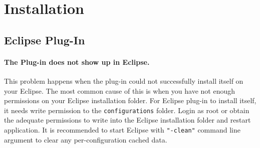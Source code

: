 \section{Installation}
\subsection{Eclipse Plug-In}
\paragraph{The Plug-in does not show up in Eclipse.} This problem happens when the plug-in could not successfully install itself on your Eclipse. The most common cause of this is when you have not enough permissions on your Eclipse installation folder. For Eclipse plug-in to install itself, it needs write permission to the \texttt{configurations} folder. Login as root or obtain the adequate permissions to write into the Eclipse installation folder and restart application.
It is recommended to start Eclipse with \texttt{"-clean"} command line argument to clear any per-configuration cached data.